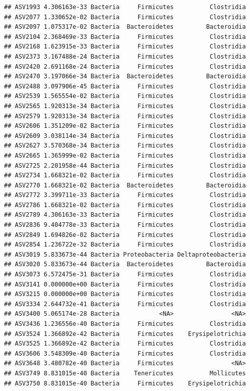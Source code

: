 \documentclass[]{article}
\begin{document}
\begin{verbatim}
## ASV1993 4.306163e-33 Bacteria     Firmicutes          Clostridia
## ASV2077 1.330652e-02 Bacteria     Firmicutes          Clostridia
## ASV2097 1.075317e-02 Bacteria  Bacteroidetes         Bacteroidia
## ASV2104 2.368469e-33 Bacteria     Firmicutes          Clostridia
## ASV2168 1.623915e-33 Bacteria     Firmicutes          Clostridia
## ASV2373 3.167488e-24 Bacteria     Firmicutes          Clostridia
## ASV2420 2.691168e-24 Bacteria     Firmicutes          Clostridia
## ASV2470 3.197066e-34 Bacteria  Bacteroidetes         Bacteroidia
## ASV2488 3.097906e-45 Bacteria     Firmicutes          Clostridia
## ASV2539 1.565554e-02 Bacteria     Firmicutes          Clostridia
## ASV2565 1.920313e-34 Bacteria     Firmicutes          Clostridia
## ASV2579 1.920313e-34 Bacteria     Firmicutes          Clostridia
## ASV2606 1.351209e-02 Bacteria     Firmicutes          Clostridia
## ASV2609 3.038114e-34 Bacteria     Firmicutes          Clostridia
## ASV2627 3.570368e-34 Bacteria     Firmicutes          Clostridia
## ASV2665 1.365999e-02 Bacteria     Firmicutes          Clostridia
## ASV2725 2.201958e-44 Bacteria     Firmicutes          Clostridia
## ASV2734 1.668321e-02 Bacteria     Firmicutes          Clostridia
## ASV2770 1.668321e-02 Bacteria  Bacteroidetes         Bacteroidia
## ASV2772 3.399711e-33 Bacteria     Firmicutes          Clostridia
## ASV2786 1.668321e-02 Bacteria     Firmicutes          Clostridia
## ASV2789 4.306163e-33 Bacteria     Firmicutes          Clostridia
## ASV2836 9.404778e-33 Bacteria     Firmicutes          Clostridia
## ASV2849 1.694826e-02 Bacteria     Firmicutes          Clostridia
## ASV2854 1.236722e-32 Bacteria     Firmicutes          Clostridia
## ASV3019 5.833673e-44 Bacteria Proteobacteria Deltaproteobacteria
## ASV3020 5.833673e-44 Bacteria  Bacteroidetes         Bacteroidia
## ASV3073 6.572475e-31 Bacteria     Firmicutes          Clostridia
## ASV3141 0.000000e+00 Bacteria     Firmicutes          Clostridia
## ASV3215 0.000000e+00 Bacteria     Firmicutes          Clostridia
## ASV3334 2.644732e-41 Bacteria     Firmicutes          Clostridia
## ASV3400 5.065174e-28 Bacteria           <NA>                <NA>
## ASV3436 1.236556e-40 Bacteria     Firmicutes          Clostridia
## ASV3524 1.366892e-42 Bacteria     Firmicutes    Erysipelotrichia
## ASV3525 1.366892e-42 Bacteria     Firmicutes          Clostridia
## ASV3606 3.548309e-40 Bacteria     Firmicutes          Clostridia
## ASV3648 3.480782e-40 Bacteria     Firmicutes                <NA>
## ASV3749 8.831015e-40 Bacteria    Tenericutes          Mollicutes
## ASV3750 8.831015e-40 Bacteria     Firmicutes    Erysipelotrichia

\end{verbatim}
\end{document}
